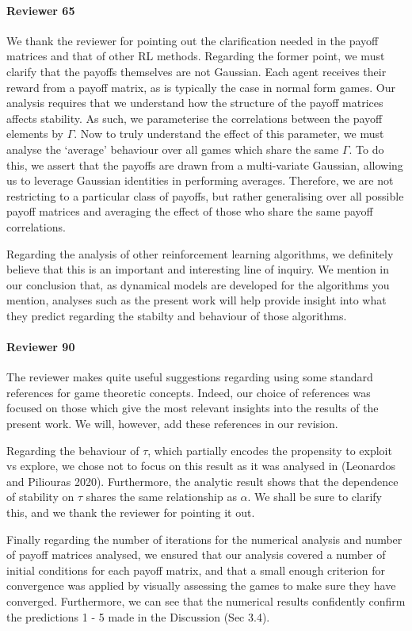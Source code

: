 \documentclass{article}
\begin{document}

\paragraph{Reviewer 65} %
\label{par:reviewer_65}

We thank the reviewer for pointing out the clarification needed in the payoff matrices and that of
other RL methods. Regarding the former point, we must clarify that the payoffs themselves are not
Gaussian. Each agent receives their reward from a payoff matrix, as is typically the case in normal
form games. Our analysis requires that we understand how the structure of the payoff matrices
affects stability. As such, we parameterise the correlations between the payoff elements by
$\Gamma$. Now to truly understand the effect of this parameter, we must analyse the `average'
behaviour over all games which share the same $\Gamma$. To do this, we assert that the payoffs are
drawn from a multi-variate Gaussian, allowing us to leverage Gaussian identities in performing
averages. Therefore, we are not restricting to a particular class of payoffs, but rather
generalising over all possible payoff matrices and averaging the effect of those who share the same
payoff correlations.

Regarding the analysis of other reinforcement learning algorithms, we definitely believe that this
is an important and interesting line of inquiry. We mention in our conclusion that, as
dynamical models are developed for the algorithms you mention, analyses such as the present work
will help provide insight into what they predict regarding the stabilty and behaviour of those
algorithms.

\paragraph{Reviewer 90} %
\label{par:reviewer_90}

The reviewer makes quite useful suggestions regarding using some standard references for game
theoretic concepts. Indeed, our choice of references was focused on those which give the most
relevant insights into the results of the present work. We will, however, add these references in
our revision.

Regarding the behaviour of $\tau$, which partially encodes the propensity to exploit vs explore, we
chose not to focus on this result as it was analysed in (Leonardos and Piliouras 2020). Furthermore,
the analytic result shows that the dependence of stability on $\tau$ shares the same relationship as
$\alpha$. We shall be sure to clarify this, and we thank the reviewer for pointing it out.

Finally regarding the number of iterations for the numerical analysis and number of payoff matrices
analysed, we ensured that our analysis covered a number of initial conditions for each payoff
matrix, and that a small enough criterion for convergence was applied by visually assessing the
games to make sure they have converged. Furthermore, we can see that the numerical results
confidently confirm the predictions 1 - 5 made in the Discussion (Sec 3.4). 
\end{document}
